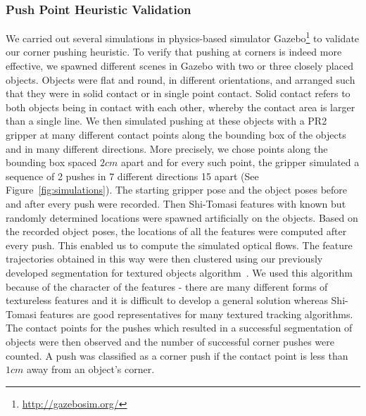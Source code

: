 \subsubsection{Push Point Heuristic Validation}
We carried  out several simulations  in physics-based simulator Gazebo\footnote{\url{http://gazebosim.org/}} to validate  our corner
pushing heuristic. To verify that  pushing at corners is  indeed more
effective, we  spawned different  scenes in Gazebo  with two  or three
closely  placed objects. Objects were flat and round, in different orientations, 
and arranged such that they were in solid contact or in single point contact. Solid  contact refers to  both objects being in  contact with
each  other,  whereby  the  contact  area  is  larger  than  a  single
line.
We  then simulated  pushing at  these objects
with a PR2 gripper at many different contact points along the bounding
box of the  objects and in many different  directions. More precisely,
we chose points along the bounding box spaced $2cm$ apart and for every
such  point,  the  gripper simulated  a  sequence  of  2 pushes  in  7
different directions {15\textdegree}  apart (See Figure~\ref{fig:simulations}). The starting gripper pose
and the object  poses before and after every  push were recorded. Then
Shi-Tomasi features with known but randomly determined  locations were spawned artificially on
the objects. Based on the  recorded object poses, the locations of all
the  features were  computed  after  every push.  This  enabled us  to
compute the simulated optical flows. The feature trajectories obtained in this way were
then clustered using our previously developed segmentation for textured objects algorithm~\cite{bersch12interactive}.
We used this algorithm because of the character of the features - there are many different forms of textureless features and it is difficult to develop a general solution whereas Shi-Tomasi features are good representatives for many textured tracking algorithms.  The contact points for the
pushes  which resulted in  a successful  segmentation of  objects were
then  observed  and  the  number  of  successful  corner  pushes  were
counted. A push  was classified as a corner push  if the contact point
is less than $1cm$ away from an object's corner.

